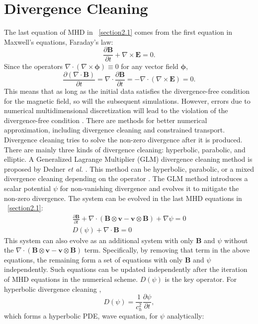 \section{Divergence Cleaning}
\label{section 2.2}
The last equation of MHD in ~\ref{section2.1} comes from the first equation in Maxwell's equations, Faraday's law:
$$\frac{\partial \mathbf{B}}{\partial t} + \nabla \times \mathbf{E} = 0.$$
Since the operators $\nabla\cdot\left(\nabla\times\mathbf{\phi}\right)\equiv0$ for any vector field $\mathbf{\phi}$, $$\frac{\partial\left(\nabla\cdot\mathbf{B}\right)}{\partial t}=\nabla\cdot\frac{\partial \mathbf{B}}{\partial t}=-\nabla\cdot\left(\nabla\times\mathbf{E}\right)=0.$$
This means that as long as the initial data satisfies the divergence-free condition for the magnetic field, so will the subsequent simulations. However, errors due to numerical multidimensional discretization will lead to the violation of the divergence-free condition \cite{vides2013divergence}. There are methods for better numerical approximation, including divergence cleaning and constrained transport.
Divergence cleaning tries to solve the non-zero divergence after it is produced. There are mainly three kinds of divergence cleaning: hyperbolic, parabolic, and elliptic. A Generalized Lagrange Multiplier (GLM) divergence cleaning method is proposed by Dedner \textit{et al.} \cite{dedner2002hyperbolic}. This method can be hyperbolic, parabolic, or a mixed divergence cleaning depending on the operator \cite{vides2013divergence}. The GLM method introduces a scalar potential $\psi$ for non-vanishing divergence and evolves it to mitigate the non-zero divergence. The system can be evolved in the last MHD equations in ~\ref{section2.1}:
\begin{align*}
\frac{\partial \mathbf{B}}{\partial t} + \nabla \cdot (\mathbf{B} \otimes \mathbf{v} - \mathbf{v} \otimes \mathbf{B}) + \nabla \psi = 0\\
D(\psi) + \nabla \cdot \mathbf{B} = 0
\end{align*}
This system can also evolve as an additional system with only $\mathbf{B}$ and $\psi$ without the $ \nabla \cdot (\mathbf{B} \otimes \mathbf{v} - \mathbf{v} \otimes \mathbf{B})$ term. Specifically, by removing that term in the above equations, the remaining form a set of equations with only $\mathbf{B}$ and $\psi$ independently. Such equations can be updated independently after the iteration of MHD equations in the numerical scheme. $D(\psi)$ is the key operator. For hyperbolic divergence cleaning \cite{vides2013divergence},  $$D(\psi) = \frac{1}{c_h^2} \frac{\partial \psi}{\partial t},$$ which forms a hyperbolic PDE, wave equation, for $\psi$ analytically: 
